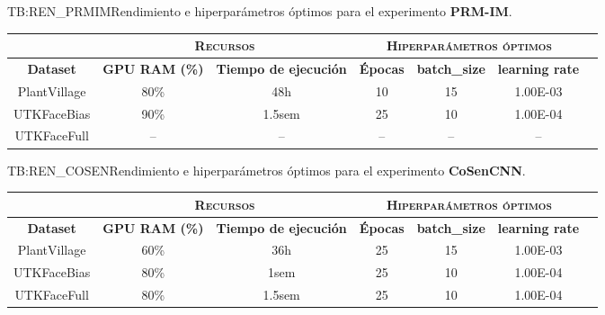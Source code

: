 \begin{table}[Rendimiento PRM-IM]{TB:REN_PRMIM}{Rendimiento e hiperparámetros óptimos para el experimento \textbf{PRM-IM}.}
    \small
    \begin{tabular}{|c|c|c|c|c|c|c|}
    \hline
         &  \multicolumn{2}{c|}{\textsc{Recursos}} & \multicolumn{3}{c|}{\textsc{Hiperparámetros óptimos}} \\ \hline
        \textbf{Dataset} & \textbf{GPU RAM (\%)} & \textbf{Tiempo de ejecución} & \textbf{Épocas} & \textbf{batch\_size} & \textbf{learning rate} \\ \hline
        PlantVillage & 80\% & 48h & 10 & 15 & 1.00E-03 \\ \hline
        UTKFaceBias & 90\% & 1.5sem & 25 & 10 & 1.00E-04 \\ \hline
        UTKFaceFull & -- & -- & -- & -- & -- \\ \hline
    \end{tabular}
\end{table}

\begin{table}[Rendimiento CoSenCNN]{TB:REN_COSEN}{Rendimiento e hiperparámetros óptimos para el experimento \textbf{CoSenCNN}.}
    \small
    \begin{tabular}{|c|c|c|c|c|c|c|}
    \hline
         &  \multicolumn{2}{c|}{\textsc{Recursos}} & \multicolumn{3}{c|}{\textsc{Hiperparámetros óptimos}} \\ \hline
        \textbf{Dataset} & \textbf{GPU RAM (\%)} & \textbf{Tiempo de ejecución} & \textbf{Épocas} & \textbf{batch\_size} & \textbf{learning rate} \\ \hline
        PlantVillage & 60\% & 36h & 25 & 15 & 1.00E-03 \\ \hline
        UTKFaceBias & 80\% & 1sem & 25 & 10 & 1.00E-04 \\ \hline
        UTKFaceFull & 80\% & 1.5sem & 25 & 10 & 1.00E-04 \\ \hline
    \end{tabular}
\end{table}
